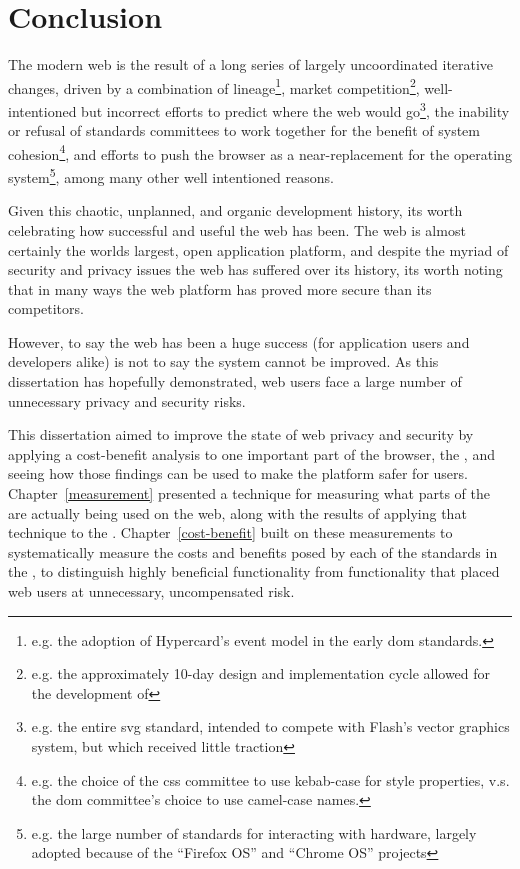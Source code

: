 \chapter{Conclusion}
\label{conclusion}

The modern web is the result of a long series of largely uncoordinated
iterative changes, driven by a combination of lineage\footnote{e.g. the
adoption of Hypercard's event model in the early \gls{dom} standards.}, market
competition\footnote{e.g. the approximately 10-day design and implementation
cycle allowed for the development of \JS}, well-intentioned but incorrect
efforts to predict where the web would go\footnote{e.g. the entire \gls{svg}
\WAPI standard, intended to compete with Flash's vector graphics system, but
which received little traction}, the inability or refusal of standards
committees to work together for the benefit of system cohesion\footnote{e.g.
the choice of the \gls{css} committee to use kebab-case for style properties,
v.s.  the \gls{dom} committee's choice to use camel-case names.}, and efforts
to push the browser as a near-replacement for the operating
system\footnote{e.g. the large number of \WAPI standards for interacting with
hardware, largely adopted because of the ``Firefox OS'' and ``Chrome OS''
projects}, among many other well intentioned reasons.

Given this chaotic, unplanned, and organic development history, its worth
celebrating how successful and useful the web has been.  The web is almost
certainly the worlds largest, open application platform, and despite the myriad
of security and privacy issues the web has suffered over its history, its worth
noting that in many ways the web platform has proved more secure than its
competitors.

However, to say the web has been a huge success (for application users and
developers alike) is not to say the system cannot be improved.  As this
dissertation has hopefully demonstrated, web users face a large number of
unnecessary privacy and security risks.

This dissertation aimed to improve the state of web privacy and security
by applying a cost-benefit analysis to one important part of the browser,
the \WAPI, and seeing how those findings can be used to make the platform
safer for users.  Chapter~\ref{measurement} presented a technique for measuring
what parts of the \WAPI are actually being used on the web, along with the
results of applying that technique to the \ATK.  Chapter~\ref{cost-benefit}
built on these measurements to systematically measure the costs and benefits
posed by each of the standards in the \WAPI, to distinguish
highly beneficial functionality from functionality that placed web users
at unnecessary, uncompensated risk.


